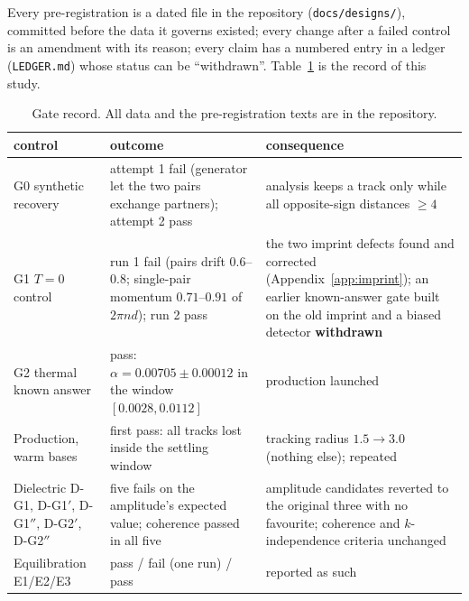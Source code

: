 \documentclass[11pt,a4paper]{article}
\begin{document}
Every pre-registration is a dated file in the repository (\texttt{docs/designs/}), committed before the data it
governs existed; every change after a failed control is an amendment with its reason; every claim has a numbered
entry in a ledger (\texttt{LEDGER.md}) whose status can be ``withdrawn''. Table~\ref{tab:gates} is the record of this
study.

\begin{table}[h]\centering\small
\begin{tabular}{p{3.6cm}p{5.9cm}p{5.2cm}}
\toprule
control & outcome & consequence\\
\midrule
G0 synthetic recovery & attempt 1 fail (generator let the two pairs exchange partners); attempt 2 pass & analysis keeps a track only while all opposite-sign distances $\ge4$\\
G1 $T=0$ control & run 1 fail (pairs drift $0.6$--$0.8$; single-pair momentum $0.71$--$0.91$ of $2\pi nd$); run 2 pass & the two imprint defects found and corrected (Appendix~\ref{app:imprint}); an earlier known-answer gate built on the old imprint and a biased detector \textbf{withdrawn}\\
G2 thermal known answer & pass: $\alpha=0.00705\pm0.00012$ in the window $[0.0028,0.0112]$ & production launched\\
Production, warm bases & first pass: all tracks lost inside the settling window & tracking radius $1.5\to3.0$ (nothing else); repeated\\
Dielectric D-G1, D-G1$'$, D-G1$''$, D-G2$'$, D-G2$''$ & five fails on the amplitude's expected value; coherence passed in all five & amplitude candidates reverted to the original three with no favourite; coherence and $k$-independence criteria unchanged\\
Equilibration E1/E2/E3 & pass / fail (one run) / pass & reported as such\\
\bottomrule
\end{tabular}
\caption{Gate record. All data and the pre-registration texts are in the repository.}
\label{tab:gates}
\end{table}
\end{document}

